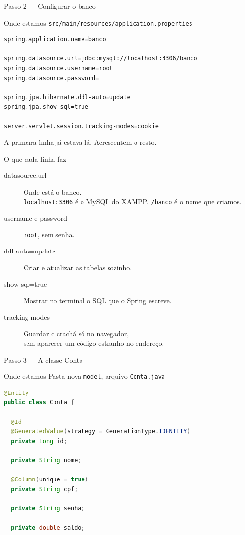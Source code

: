 \documentclass[aspectratio=169,11pt]{beamer}
\newcommand{\onde}[1]{%
  \begin{block}{Onde estamos}
    #1
  \end{block}
}
\begin{document}
\begin{frame}[fragile]{Passo 2 --- Configurar o banco}
  \onde{\texttt{src/main/resources/application.properties}}

\begin{lstlisting}[language=props,basicstyle=\ttfamily\footnotesize]
spring.application.name=banco

spring.datasource.url=jdbc:mysql://localhost:3306/banco
spring.datasource.username=root
spring.datasource.password=

spring.jpa.hibernate.ddl-auto=update
spring.jpa.show-sql=true

server.servlet.session.tracking-modes=cookie
\end{lstlisting}

  A primeira linha já estava lá. Acrescentem o resto.
\end{frame}

\begin{frame}{O que cada linha faz}
  \begin{description}
    \item[datasource.url] Onde está o banco.\\
      \texttt{localhost:3306} é o MySQL do XAMPP.
      \texttt{/banco} é o nome que criamos.
    \item[username e password] \texttt{root}, sem senha.
    \item[ddl-auto=update] Criar e atualizar as tabelas sozinho.
    \item[show-sql=true] Mostrar no terminal o SQL que o Spring escreve.
    \item[tracking-modes] Guardar o crachá só no navegador,\\
      sem aparecer um código estranho no endereço.
  \end{description}
\end{frame}

\begin{frame}[fragile]{Passo 3 --- A classe Conta}
  \onde{Pasta nova \texttt{model}, arquivo \texttt{Conta.java}}

\begin{lstlisting}[language=Java,basicstyle=\ttfamily\scriptsize]
@Entity
public class Conta {

  @Id
  @GeneratedValue(strategy = GenerationType.IDENTITY)
  private Long id;

  private String nome;

  @Column(unique = true)
  private String cpf;

  private String senha;

  private double saldo;
\end{lstlisting}
\end{frame}
\end{document}
